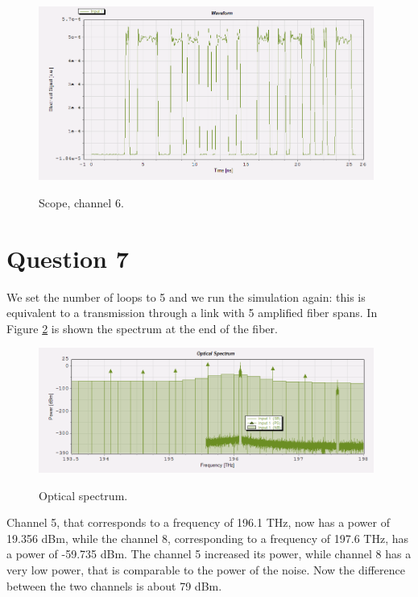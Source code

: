 \documentclass[a4paper,10pt]{report}
\begin{document}
\begin{figure}[!ht]
   \centering
   \includegraphics[width=11cm]{es6scope2.png}\\
   \caption{Scope, channel 6.}
   \label{es6scope2}
\end{figure}


\section*{Question 7}
We set the number of loops to 5 and we run the simulation again: this is equivalent to a transmission through a link with
5 amplified fiber spans. In Figure \ref{es7} is shown the spectrum at the end of the fiber.

\begin{figure}[!ht]
   \centering
   \includegraphics[width=11cm]{es7.png}\\
   \caption{Optical spectrum.}
   \label{es7}
\end{figure}

Channel 5, that corresponds to a frequency of 196.1 THz, now has a power of 19.356 dBm, while the channel 8,
corresponding to a frequency of 197.6 THz, has a power of -59.735 dBm.
The channel 5 increased its power, while channel 8 has a very low power, that is comparable to the power of the noise.
Now the difference between the two channels is about 79 dBm.

\newpage
\end{document}
